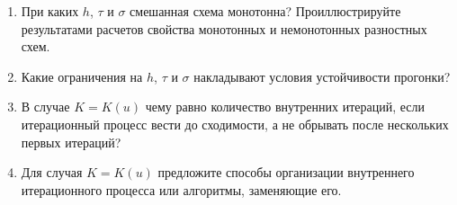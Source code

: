 \documentclass[12pt, a4paper]{article}
\begin{document}
\begin{enumerate}
\item При каких $h$, $\tau$ и $\sigma$ смешанная схема монотонна? Проиллюстрируйте результатами расчетов свойства монотонных и немонотонных разностных схем.

\item Какие ограничения на $h$, $\tau$ и $\sigma$ накладывают условия устойчивости прогонки?

\item В случае $K=K(u)$ чему равно количество внутренних итераций, если итерационный процесс вести до сходимости, а не обрывать после нескольких первых итераций?

\item Для случая $K = K(u)$ предложите способы организации внутреннего итерационного процесса или алгоритмы, заменяющие его.
\end{enumerate}


\newpage
\end{document}
